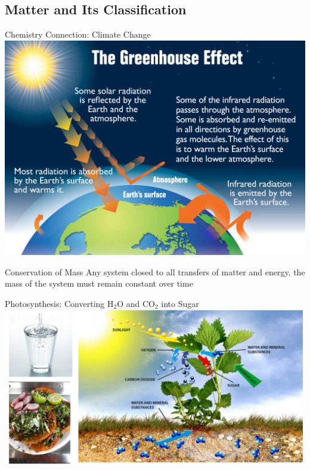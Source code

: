 \documentclass[11pt]{beamer}
\begin{document}
\subsection{Matter and Its Classification}

\begin{frame}{Chemistry Connection: Climate Change}
  \centering
  \includegraphics[scale=1.5]{greenhouse_effect}
\end{frame}

\begin{frame}{Conservation of Mass}
  Any system closed to all transfers of matter and energy, the mass
  of the system must remain constant over time
\end{frame}

\begin{frame}{Photosynthesis: Converting H$_2$O and CO$_2$ into Sugar}
  \centering
  \includegraphics[trim={8in 0 0 0},clip,width=1\linewidth]{food_pic}
\end{frame}
\end{document}
